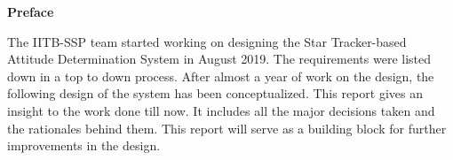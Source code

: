 \newpage
\thispagestyle{plain}
\begin{center}
    \Large{\textbf{Preface}}
\end{center}


The IITB-SSP team started working on designing the Star Tracker-based Attitude Determination System in August 2019. The requirements were listed down in a top to down process. After almost a year of work on the design, the following design of the system has been conceptualized. This report gives an insight to the work done till now. It includes all the major decisions taken and the rationales behind them. This report will serve as a building block for further improvements in the design.


